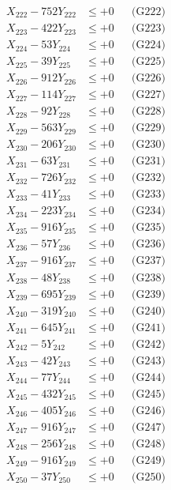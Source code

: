 \documentclass[a4paper,10pt]{article}
\begin{document}
{\begin{align}
X_{222} - 752Y_{222} &\leq +0 && \text{(G222)} \\
X_{223} - 422Y_{223} &\leq +0 && \text{(G223)} \\
X_{224} - 53Y_{224} &\leq +0 && \text{(G224)} \\
X_{225} - 39Y_{225} &\leq +0 && \text{(G225)} \\
X_{226} - 912Y_{226} &\leq +0 && \text{(G226)} \\
X_{227} - 114Y_{227} &\leq +0 && \text{(G227)} \\
X_{228} - 92Y_{228} &\leq +0 && \text{(G228)} \\
X_{229} - 563Y_{229} &\leq +0 && \text{(G229)} \\
X_{230} - 206Y_{230} &\leq +0 && \text{(G230)} \\
\allowbreak
X_{231} - 63Y_{231} &\leq +0 && \text{(G231)} \\
X_{232} - 726Y_{232} &\leq +0 && \text{(G232)} \\
X_{233} - 41Y_{233} &\leq +0 && \text{(G233)} \\
X_{234} - 223Y_{234} &\leq +0 && \text{(G234)} \\
X_{235} - 916Y_{235} &\leq +0 && \text{(G235)} \\
X_{236} - 57Y_{236} &\leq +0 && \text{(G236)} \\
X_{237} - 916Y_{237} &\leq +0 && \text{(G237)} \\
X_{238} - 48Y_{238} &\leq +0 && \text{(G238)} \\
X_{239} - 695Y_{239} &\leq +0 && \text{(G239)} \\
X_{240} - 319Y_{240} &\leq +0 && \text{(G240)} \\
\allowbreak
X_{241} - 645Y_{241} &\leq +0 && \text{(G241)} \\
X_{242} - 5Y_{242} &\leq +0 && \text{(G242)} \\
X_{243} - 42Y_{243} &\leq +0 && \text{(G243)} \\
X_{244} - 77Y_{244} &\leq +0 && \text{(G244)} \\
X_{245} - 432Y_{245} &\leq +0 && \text{(G245)} \\
X_{246} - 405Y_{246} &\leq +0 && \text{(G246)} \\
X_{247} - 916Y_{247} &\leq +0 && \text{(G247)} \\
X_{248} - 256Y_{248} &\leq +0 && \text{(G248)} \\
X_{249} - 916Y_{249} &\leq +0 && \text{(G249)} \\
X_{250} - 37Y_{250} &\leq +0 && \text{(G250)} \\

\end{align}}
\end{document}
